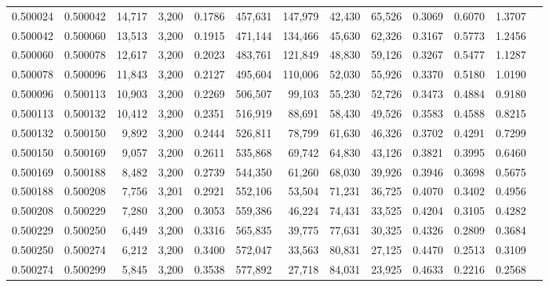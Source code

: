\begin{tabular}{rrrrrrrrrrrrr}
0.500024 & 0.500042 & 14,717 & 3,200 &                                     0.1786 & 457,631 & 147,979 &  42,430 &  65,526 & 0.3069 & 0.6070 & 1.3707 \\
0.500042 & 0.500060 & 13,513 & 3,200 &                                     0.1915 & 471,144 & 134,466 &  45,630 &  62,326 & 0.3167 & 0.5773 & 1.2456 \\
0.500060 & 0.500078 & 12,617 & 3,200 &                                     0.2023 & 483,761 & 121,849 &  48,830 &  59,126 & 0.3267 & 0.5477 & 1.1287 \\
0.500078 & 0.500096 & 11,843 & 3,200 &                                     0.2127 & 495,604 & 110,006 &  52,030 &  55,926 & 0.3370 & 0.5180 & 1.0190 \\
0.500096 & 0.500113 & 10,903 & 3,200 &                                     0.2269 & 506,507 &  99,103 &  55,230 &  52,726 & 0.3473 & 0.4884 & 0.9180 \\
0.500113 & 0.500132 & 10,412 & 3,200 &                                     0.2351 & 516,919 &  88,691 &  58,430 &  49,526 & 0.3583 & 0.4588 & 0.8215 \\
0.500132 & 0.500150 &  9,892 & 3,200 &                                     0.2444 & 526,811 &  78,799 &  61,630 &  46,326 & 0.3702 & 0.4291 & 0.7299 \\
0.500150 & 0.500169 &  9,057 & 3,200 &                                     0.2611 & 535,868 &  69,742 &  64,830 &  43,126 & 0.3821 & 0.3995 & 0.6460 \\
0.500169 & 0.500188 &  8,482 & 3,200 &                                     0.2739 & 544,350 &  61,260 &  68,030 &  39,926 & 0.3946 & 0.3698 & 0.5675 \\
0.500188 & 0.500208 &  7,756 & 3,201 &                                     0.2921 & 552,106 &  53,504 &  71,231 &  36,725 & 0.4070 & 0.3402 & 0.4956 \\
0.500208 & 0.500229 &  7,280 & 3,200 &                                     0.3053 & 559,386 &  46,224 &  74,431 &  33,525 & 0.4204 & 0.3105 & 0.4282 \\
0.500229 & 0.500250 &  6,449 & 3,200 &                                     0.3316 & 565,835 &  39,775 &  77,631 &  30,325 & 0.4326 & 0.2809 & 0.3684 \\
0.500250 & 0.500274 &  6,212 & 3,200 &                                     0.3400 & 572,047 &  33,563 &  80,831 &  27,125 & 0.4470 & 0.2513 & 0.3109 \\
0.500274 & 0.500299 &  5,845 & 3,200 &                                     0.3538 & 577,892 &  27,718 &  84,031 &  23,925 & 0.4633 & 0.2216 & 0.2568 \\

\end{tabular}
